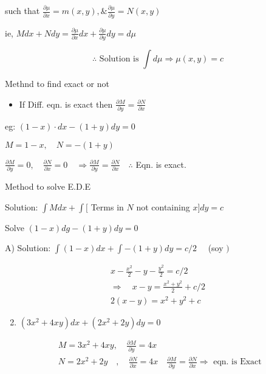 \documentclass[12pt, a4paper]{article}
\begin{document}
such that $\frac{\partial \mu}{\partial x}=m(x, y), \& \frac{\partial \mu}{\partial y}=N(x, y)$

ie, $M d x+N d y=\frac{\partial \mu}{\partial x} d x+\frac{\partial \mu}{\partial y} d y=d \mu$

$$
	\therefore \text{ Solution is } \int d \mu \Rightarrow \mu(x, y)=c
$$

Methnd to find exact or not

\begin{itemize}
	\item If Diff. eqn. is exact then $\frac{\partial M}{\partial y}=\frac{\partial N}{\partial x}$
\end{itemize}

eg: $(1-x) \cdot d x-(1+y) d y=0$

$M=1-x, \quad N=-(1+y)$

$\frac{\partial M}{\partial y}=0, \quad \frac{\partial N}{\partial x}=0 \quad \Rightarrow \frac{\partial M}{\partial y}=\frac{\partial N}{\partial x} \quad \therefore$ Eqn. is exact.

Method to solve E.D.E

Solution: $\int M d x+\int[$ Terms in $N$ not containing $x] d y=c$

Solve $(1-x) d g-(1+y) d y=0$

A) Solution: $\int(1-x) d x+\int-(1+y) d y=c / 2 \quad$ (soy $)$

$$
	\begin{gathered}
		x-\frac{x^2 }{2}-y-\frac{y^2}{2}=c / 2 \\
		\Rightarrow \quad x-y=\frac{x^2 +y^2}{2}+c / 2 \\
		2(x-y)=x^2 +y^2+c
	\end{gathered}
$$

\begin{enumerate}
	\setcounter{enumi}{1}
	\item $\left(3 x^2 +4 x y\right) d x+\left(2 x^2 +2 y\right) d y=0$
\end{enumerate}

$$
	\begin{aligned}
		 & M=3 x^2 +4 x y, \quad \frac{\partial M}{\partial y}=4 x                                                                                                          \\
		 & N=2 x^2 +2 y \quad, \quad \frac{\partial N}{\partial x}=4 x \quad \frac{\partial M}{\partial y}=\frac{\partial N}{\partial x} \Rightarrow \text{ eqn. is Exact }
	\end{aligned}
$$
\end{document}
